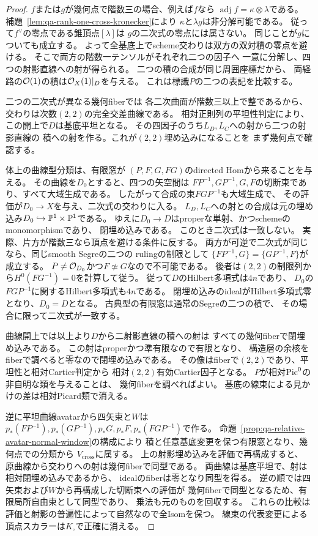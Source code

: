 \begin{proof}
$f$または$g$が幾何点で階数三の場合、例えば$f$なら
$\operatorname{adj}f=\kappa\otimes\lambda$である。
補題~\ref{lem:qa-rank-one-cross-kronecker}により
$\kappa$と$\lambda g$は非分解可能である。
従って$f^\vee$の零点である錐頂点$[\lambda]$は
$g$の二次式の零点には属さない。
同じことが$g$についても成立する。
よって全基底上でscheme交わりは双方の双対積の零点を避ける。
そこで両方の階数一テンソルがそれぞれ二つの因子へ
一意に分解し、四つの射影直線への射が得られる。
二つの積の合成が同じ周囲座標だから、
両経路の$\mathcal O(1)$の積は$\mathcal O_X(1)|_D$を与える。
これは標識$P$の二つの表記を比較する。

二つの二次式が異なる幾何fiberでは
各二次曲面が階数三以上で整であるから、
交わりは次数$(2,2)$の完全交差曲線である。
相対正則列の平坦性判定により、この開上で$D$は基底平坦となる。
その四因子のうち$L_D,L_C$への射から二つの射影直線の
積への射を作る。これが$(2,2)$埋め込みになることを
まず幾何点で確認する。

体上の曲線型分類は、有限窓が
$(P,F,G,FG)$のdirected Homから来ることを与える。
その曲線を$D_0$とすると、四つの矢空間は
$FP^{-1},GP^{-1},G,F$の切断束であり、すべて大域生成である。
したがって合成の束$FGP^{-1}$も大域生成で、
その評価が$D_0\to X$を与え、二次式の交わりに入る。
$L_D,L_C$への射との合成は元の埋め込み$D_0\hookrightarrow
\mathbb P^1\times\mathbb P^1$である。
ゆえに$D_0\to D$はproperな単射、かつschemeのmonomorphismであり、
閉埋め込みである。
このとき二次式は一致しない。
実際、片方が階数三なら頂点を避ける条件に反する。
両方が可逆で二次式が同じなら、同じsmooth Segreの二つの
rulingの制限として
$\{FP^{-1},G\}=\{GP^{-1},F\}$が成立する。
$P\ne\mathcal O_{D_0}$かつ$F\not\simeq G$なので不可能である。
後者は$(2,2)$の制限列から$H^0(FG^{-1})=0$を計算して従う。
従って$D$のHilbert多項式は$4n$であり、
$D_0$の$FGP^{-1}$に関するHilbert多項式も$4n$である。
閉埋め込みのidealがHilbert多項式零となり、$D_0=D$となる。
古典型の有限窓は通常のSegreの二つの積で、
その場合に限って二次式が一致する。

曲線開上では以上より$D$から二射影直線の積への射は
すべての幾何fiberで閉埋め込みである。
この射はproperかつ準有限なので有限となり、
構造層の余核をfiberで調べると零なので閉埋め込みである。
その像はfiberで$(2,2)$であり、平坦性と相対Cartier判定から
相対$(2,2)$有効Cartier因子となる。
$P$が相対$\operatorname{Pic}^0$の非自明な類を与えることは、
幾何fiberを調べればよい。
基底の線束による見かけの差は相対Picard類で消える。

逆に平坦曲線avatarから四矢束と$W$は
$p_*(FP^{-1}),p_*(GP^{-1}),p_*G,p_*F,p_*(FGP^{-1})$で作る。
命題~\ref{prop:qa-relative-avatar-normal-window}の構成により
積と任意基底変更を保つ有限窓となり、幾何点での分類から
$V_{\mathrm{cross}}$に属する。
上の射影埋め込みを評価で再構成すると、
原曲線から交わりへの射は幾何fiberで同型である。
両曲線は基底平坦で、射は相対閉埋め込みであるから、
idealのfiberは零となり同型を得る。
逆の順では四矢束および$W$から再構成した切断束への評価が
幾何fiberで同型となるため、有限局所自由束として同型であり、
乗法も元のものを回収する。
これらの比較は評価と射影の普遍性によって自然なので全Isomを保つ。
線束の代表変更による頂点スカラーは$K_\square$で正確に消える。


\end{proof}
